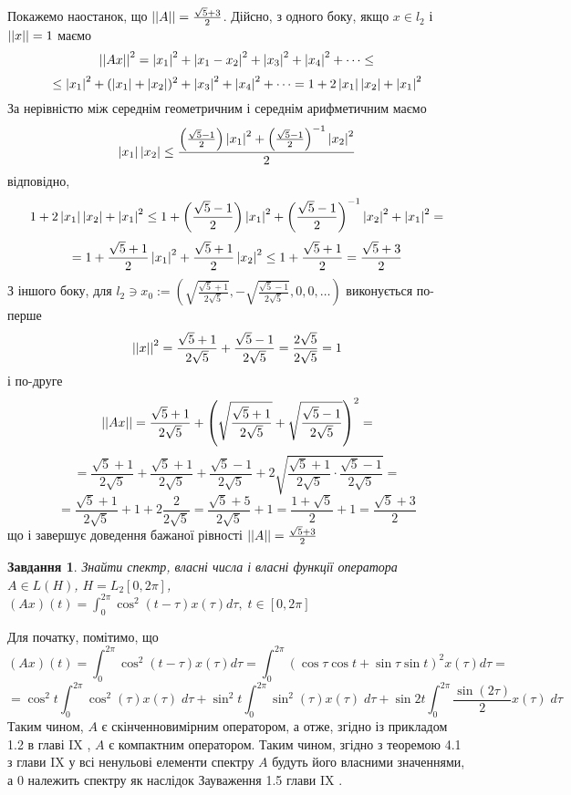 \documentclass[12pt]{article} %
\newtheorem{prob}{Завдання}
\begin{document}
	Покажемо наостанок, що $\left|\left|A\right|\right|=\frac{\sqrt{5}+3}{2}$. Дійсно, з одного боку, якщо $x\in l_2$ і $\left|\left|x\right|\right|=1$ маємо
	\[\left|\left|Ax\right|\right|^2=\left|x_1\right|^2+\left|x_1-x_2\right|^2+\left|x_3\right|^2+\left|x_4\right|^2+\dots\leq\]
	\[\leq \left|x_1\right|^2+(\left|x_1\right|+\left|x_2\right|)^2+\left|x_3\right|^2+\left|x_4\right|^2+\dots=1+2\left|x_1\right|\left|x_2\right|+\left|x_1\right|^2\]
	За нерівністю між середнім геометричним і середнім арифметичним маємо
	\[\left|x_1\right|\left|x_2\right|\leq\frac{\left({\frac{\sqrt{5}-1}{2}}\right)\left|x_1\right|^2+\left(\frac{\sqrt{5}-1}{2}\right)^{-1}\left|x_2\right|^2}{2}\]
	відповідно,
	\[1+2\left|x_1\right|\left|x_2\right|+\left|x_1\right|^2
	\leq1+\left({\frac{\sqrt{5}-1}{2}}\right)\left|x_1\right|^2+\left(\frac{\sqrt{5}-1}{2}\right)^{-1}\left|x_2\right|^2+\left|x_1\right|^2=\]
	\[=1+\frac{\sqrt{5}+1}{2}\left|x_1\right|^2+\frac{\sqrt{5}+1}{2}\left|x_2\right|^2\leq 1+\frac{\sqrt{5}+1}{2}=\frac{\sqrt{5}+3}{2}\]
	З іншого боку, для $l_2\ni x_0:=(\sqrt{\frac{\sqrt{5}+1}{2\sqrt{5}}},-\sqrt{\frac{\sqrt{5}-1}{2\sqrt{5}}},0,0,\dots)$ виконується
	по-перше
	\[\left|\left|x\right|\right|^2=\frac{\sqrt{5}+1}{2\sqrt{5}}+\frac{\sqrt{5}-1}{2\sqrt{5}}=\frac{2\sqrt{5}}{2\sqrt{5}}=1\]
	і по-друге
	\[\left|\left|Ax\right|\right|=\frac{\sqrt{5}+1}{2\sqrt{5}}+\left(\sqrt{\frac{\sqrt{5}+1}{2\sqrt{5}}}+\sqrt{\frac{\sqrt{5}-1}{2\sqrt{5}}}\right)^2=\]\[=
	\frac{\sqrt{5}+1}{2\sqrt{5}}+\frac{\sqrt{5}+1}{2\sqrt{5}}+{\frac{\sqrt{5}-1}{2\sqrt{5}}}+2\sqrt{
	\frac{\sqrt{5}+1}{2\sqrt{5}}\cdot\frac{\sqrt{5}-1}{2\sqrt{5}}}=\]
	\[=\frac{\sqrt{5}+1}{2\sqrt{5}}+1+2\frac{2}{2\sqrt{5}}=\frac{\sqrt{5}+5}{2\sqrt{5}}+1=\frac{1+\sqrt{5}}{2}+1=\frac{\sqrt{5}+3}{2}\]
	що і завершує доведення бажаної рівності $\left|\left|A\right|\right|=\frac{\sqrt{5}+3}{2}$
\begin{prob}Знайти спектр, власні числа і власні функції оператора $A\in L(H)$, $H=L_2[0,2\pi]$, $(Ax)(t)=\int_0^{2\pi}\cos^2(t-\tau)x(\tau)
	d\tau,\;t\in[0,2\pi]$
\end{prob}
Для початку, помітимо, що
\newcommand{\myint}[1]{\int_0^{2\pi}#1x(\tau)\;d\tau}
\newcommand{\mysint}[1]{\int_0^{2\pi}#1\;d\tau}
\[(Ax)(t)=\int_0^{2\pi}\cos^2(t-\tau)x(\tau)d\tau=\int_0^{2\pi}(\cos\tau\cos t+\sin\tau\sin t)^2x(\tau)d\tau=\]
\[=\cos^2 t\myint{\cos^2(\tau)}+\sin^2 t\myint{\sin^2(\tau)}+\sin 2t\myint{\frac{\sin (2\tau)}{2}}\]
Таким чином, $A$ є скінченновимірним оператором, а отже, згідно із прикладом 1.2 в главі IX \cite{tb}, 
$A$ є компактним оператором. Таким чином, згідно з теоремою 4.1 з глави IX у \cite{tb} всі ненульові елементи спектру $A$ будуть його власними
значеннями, а $0$ належить спектру як наслідок Зауваження 1.5 глави IX \cite{tb}.
\end{document}
